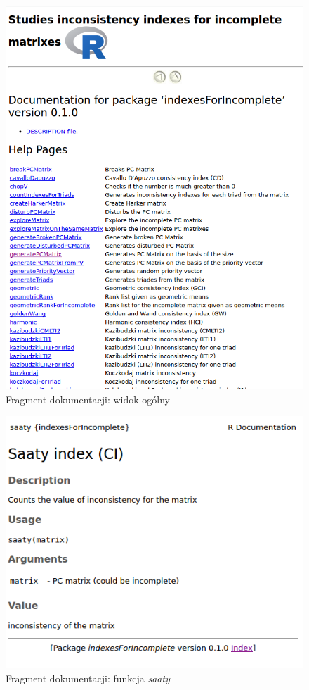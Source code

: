 \begin{figure}[!ht]
\centerline{\includegraphics[scale=0.58]{images/kod31.png}}
\caption{Fragment dokumentacji: widok ogólny}
\label{fig:rstudio}
\end{figure}

\begin{figure}[!ht]
\centerline{\includegraphics[scale=0.58]{images/kod32.png}}
\caption{Fragment dokumentacji: funkcja \textit{saaty}}
\label{fig:rstudio}
\end{figure}

